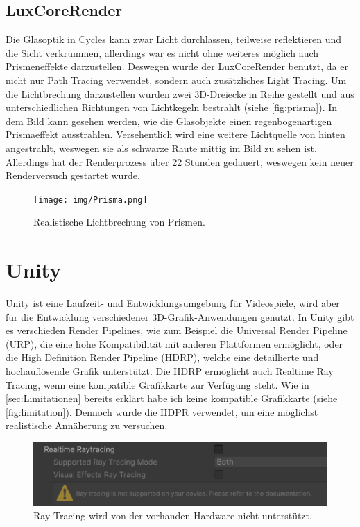 \documentclass[a4paper]{article}
\begin{document}
\subsection{LuxCoreRender}
Die Glasoptik in Cycles kann zwar Licht durchlassen, teilweise reflektieren und die Sicht verkrümmen, allerdings war es nicht ohne weiteres möglich auch Prismeneffekte darzustellen. Deswegen wurde der LuxCoreRender benutzt, da er nicht nur Path Tracing verwendet, sondern auch zusätzliches Light Tracing. Um die Lichtbrechung darzustellen wurden zwei 3D-Dreiecke in Reihe gestellt und aus unterschiedlichen Richtungen von Lichtkegeln bestrahlt (siehe \autoref{fig:prisma}). In dem Bild kann gesehen werden, wie die Glasobjekte einen regenbogenartigen Prismaeffekt ausstrahlen. Versehentlich wird eine weitere Lichtquelle von hinten angestrahlt, weswegen sie als schwarze Raute mittig im Bild zu sehen ist. Allerdings hat der Renderprozess über 22 Stunden gedauert, weswegen kein neuer Renderversuch gestartet wurde.

\begin{figure}
	\centering
	\texttt{[image: img/Prisma.png]}
	\caption{Realistische Lichtbrechung von Prismen.}
	\label{fig:prisma}
\end{figure}

\section{Unity}
\label{sec:Unity}
Unity ist eine Laufzeit- und Entwicklungsumgebung für Videospiele, wird aber für die Entwicklung verschiedener 3D-Grafik-Anwendungen genutzt. In Unity gibt es verschieden Render Pipelines, wie zum Beispiel die Universal Render Pipeline (URP), die eine hohe Kompatibilität mit anderen Plattformen ermöglicht, oder die High Definition Render Pipeline (HDRP), welche eine detaillierte und hochauflösende Grafik unterstützt. Die HDRP ermöglicht auch Realtime Ray Tracing, wenn eine kompatible Grafikkarte zur Verfügung steht. Wie in \autoref{sec:Limitationen} bereits erklärt habe ich keine kompatible Grafikkarte (siehe \autoref{fig:limitation}). Dennoch wurde die HDPR verwendet, um eine möglichst realistische Annäherung zu versuchen.

\begin{figure}[h]
	\centering
	\includegraphics[width=0.5\linewidth]{img/Limitation.png}
	\caption{Ray Tracing  wird von der vorhanden Hardware nicht unterstützt.}
	\label{fig:limitation}
\end{figure}
\end{document}
